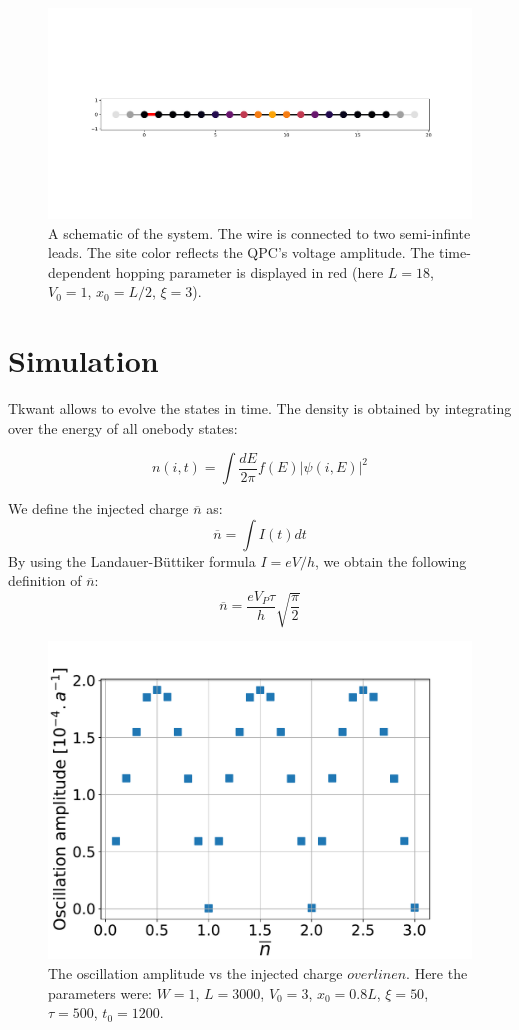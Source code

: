 \documentclass[aps,prl,preprint,groupedaddress]{revtex4-1}
\begin{document}
\begin{figure}[h]
	\centering
	\includegraphics[width = 0.6\linewidth]{../figures/syst_color}
	\caption{A schematic of the system. The wire is connected to two semi-infinte leads. The site color reflects the QPC's voltage amplitude. The time-dependent hopping parameter is displayed in red (here $L = 18$, $V_0 = 1$, $x_0 = L/2$, $\xi = 3$).}
	\label{fig:systcolor}
\end{figure}
\section{Simulation}
%
 Tkwant allows to evolve the states in time. The density is obtained by integrating over the energy of all onebody states:
 
 \begin{equation}
 n(i,t) = \int \frac{dE}{2\pi} f(E) |\psi(i,E)|^2
 \end{equation}
 
 We define the injected charge $\overline{n}$ as:
 \begin{equation}
 	\overline{n} = \int I(t)dt
 \end{equation}
 By using the Landauer-Büttiker formula $I = eV/h$, we obtain the following definition of $\overline{n}$:
 \begin{equation}
 	\overline{n} = \frac{eV_P\tau}{h}\sqrt{\frac{\pi}{2}}
 \end{equation}
 \begin{figure}
 	\centering
 	\includegraphics[width=0.7\linewidth]{../figures/A_vs_nbar_W1_L3000_V03_lx50_Ef21_u0_tau500}
 	\caption{The oscillation amplitude vs the injected charge $overline{n}$. Here the parameters were: $W =1$, $L = 3000$, $V_0 =3$, $x_0 = 0.8L$,  $\xi = 50$, $\tau = 500$, $t_0 = 1200$.}
 	\label{fig:avsnbarw1l3000v03lx50ef2}
 \end{figure}
 
 
 

\end{document}

